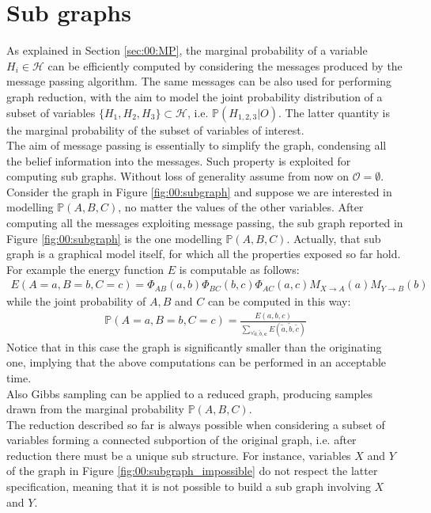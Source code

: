 \section{Sub graphs}
\label{sec:00:SUB_GRAPH}

As explained in Section \ref{sec:00:MP}, the marginal probability of a variable $H_i \in \mathcal{H}$ can be efficiently computed by considering the messages produced by the message passing algorithm. The same messages can be also used for performing graph reduction, with the aim to model the joint probability distribution of a subset of variables $\lbrace H_1, H_2, H_3 \rbrace \subset \mathcal{H}$, i.e. $\mathbb{P}( H_{1,2,3} | O)$. The latter quantity is the marginal probability of the subset of variables of interest.
\\
The aim of message passing is essentially to simplify the graph, condensing all the belief information into the messages. Such property is exploited for computing sub graphs. Without loss of generality assume from now on $\mathcal{O} = \emptyset$.
Consider the graph in Figure \ref{fig:00:subgraph} and suppose we are interested in modelling $\mathbb{P}( A,B,C)$, no matter the values of the other variables. After computing all the messages exploiting message passing, the sub graph reported in Figure \ref{fig:00:subgraph} is the one modelling $\mathbb{P}( A,B,C)$. Actually, that sub graph is a graphical model itself, for which all the properties exposed so far hold.
For example the energy function $E$ is computable as follows:
\begin{eqnarray}
E(A = a,B = b,C= c) = 
\Phi _{AB}(a,b)
\Phi _{BC}(b,c)
\Phi _{AC}(a,c)
M _{X \rightarrow A}(a)
M _{Y \rightarrow B}(b)
\end{eqnarray}
while the joint probability of $A,B$ and $C$ can be computed in this way:
\begin{eqnarray}
\mathbb{P}(A = a,B = b,C= c) = \frac{E(a,b,c)}{ 
\sum _{ \forall \tilde{a},\tilde{b}, \textbf{c}  } E(\tilde{a},\tilde{b},\tilde{c}) }
\end{eqnarray}
Notice that in this case the graph is significantly smaller than the originating one, implying that the above computations can be performed in an acceptable time.
\\
Also Gibbs sampling can be applied to a reduced graph, producing samples drawn from the marginal probability $\mathbb{P}( A,B,C)$.
\\
The reduction described so far is always possible when considering a subset of variables forming a connected subportion of the original graph, i.e. after reduction there must be a unique sub structure. For instance, variables $X$ and $Y$ of the graph in Figure \ref{fig:00:subgraph_impossible} do not respect the latter specification, meaning that it is not possible to build a sub graph involving $X$ and $Y$.

